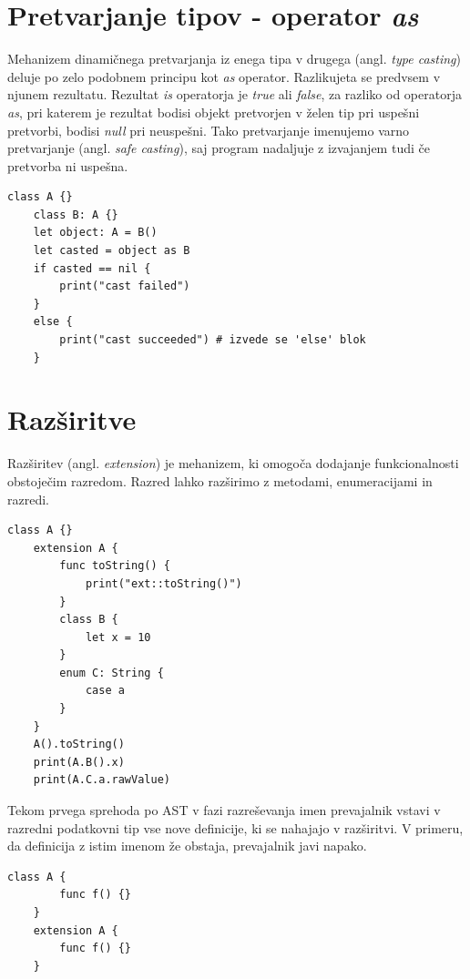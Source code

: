\documentclass[a4paper, 12p]{book}
\begin{document}
\section{Pretvarjanje tipov - operator \textit{as}}

Mehanizem dinamičnega pretvarjanja iz enega tipa v drugega (angl. \textit{type casting}) deluje po zelo podobnem principu kot \textit{as} operator. Razlikujeta se predvsem v njunem rezultatu. Rezultat \textit{is} operatorja je \textit{true} ali \textit{false}, za razliko od operatorja \textit{as}, pri katerem je rezultat bodisi objekt pretvorjen v želen tip pri uspešni pretvorbi, bodisi \textit{null} pri neuspešni. Tako pretvarjanje imenujemo varno pretvarjanje (angl. \textit{safe casting}), saj program nadaljuje z izvajanjem tudi če pretvorba ni uspešna.

\begin{lstlisting}[caption={Uporaba operatorja \textit{as}.}, captionpos=b]
	class A {}
	class B: A {}
	let object: A = B()
	let casted = object as B
	if casted == nil {
	    print("cast failed")
	}
	else {
	    print("cast succeeded") # izvede se 'else' blok
	}
\end{lstlisting}

\newpage
\section{Razširitve}

Razširitev (angl. \textit{extension}) je mehanizem, ki omogoča dodajanje funkcionalnosti obstoječim razredom. Razred lahko razširimo z metodami, enumeracijami in razredi.  

\begin{lstlisting}[caption={Razširitev razreda A.}, captionpos=b]
	class A {}
	extension A {
		func toString() {
			print("ext::toString()")
		}
		class B {
			let x = 10
		}
		enum C: String {
			case a
		}
	}
	A().toString()
	print(A.B().x)
	print(A.C.a.rawValue)
\end{lstlisting}

Tekom prvega sprehoda po AST v fazi razreševanja imen prevajalnik vstavi v razredni podatkovni tip vse nove definicije, ki se nahajajo v razširitvi. V primeru, da definicija z istim imenom že obstaja, prevajalnik javi napako.

\begin{lstlisting}[caption={Neveljavna redeklaracija funkcije \textit{f}.}, captionpos=b]
	class A {
	    func f() {}
	}
	extension A {
	    func f() {}
	}
\end{lstlisting}
\end{document}
